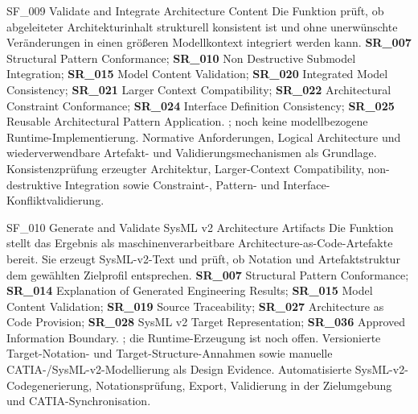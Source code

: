 \featureprofile
{SF\_009}
{Validate and Integrate Architecture Content}
{Die Funktion prüft, ob abgeleiteter Architekturinhalt strukturell konsistent
ist und ohne unerwünschte Veränderungen in einen größeren Modellkontext
integriert werden kann.}
{\textbf{SR\_007} Structural Pattern Conformance;
\textbf{SR\_010} Non Destructive Submodel Integration;
\textbf{SR\_015} Model Content Validation;
\textbf{SR\_020} Integrated Model Consistency;
\textbf{SR\_021} Larger Context Compatibility;
\textbf{SR\_022} Architectural Constraint Conformance;
\textbf{SR\_024} Interface Definition Consistency;
\textbf{SR\_025} Reusable Architectural Pattern Application.}
{; noch keine modellbezogene
Runtime-Implementierung.}
{Normative Anforderungen, Logical Architecture und wiederverwendbare
Artefakt- und Validierungsmechanismen als Grundlage.}
{Konsistenzprüfung erzeugter Architektur, Larger-Context Compatibility,
non-destruktive Integration sowie Constraint-, Pattern- und
Interface-Konfliktvalidierung.}

\featureprofile
{SF\_010}
{Generate and Validate SysML v2 Architecture Artifacts}
{Die Funktion stellt das Ergebnis als maschinenverarbeitbare
Architecture-as-Code-Artefakte bereit. Sie erzeugt SysML-v2-Text und prüft,
ob Notation und Artefaktstruktur dem gewählten Zielprofil entsprechen.}
{\textbf{SR\_007} Structural Pattern Conformance;
\textbf{SR\_014} Explanation of Generated Engineering Results;
\textbf{SR\_015} Model Content Validation;
\textbf{SR\_019} Source Traceability;
\textbf{SR\_027} Architecture as Code Provision;
\textbf{SR\_028} SysML v2 Target Representation;
\textbf{SR\_036} Approved Information Boundary.}
{; die Runtime-Erzeugung ist noch offen.}
{Versionierte Target-Notation- und Target-Structure-Annahmen sowie manuelle
CATIA-/SysML-v2-Modellierung als Design Evidence.}
{Automatisierte SysML-v2-Codegenerierung, Notationsprüfung, Export,
Validierung in der Zielumgebung und CATIA-Synchronisation.}

